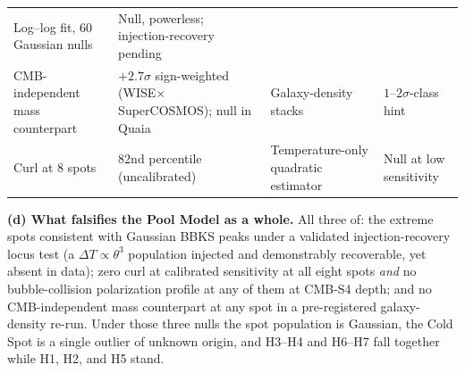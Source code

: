 \documentclass[
]{article}
\begin{document}
\begin{longtable}[]{@{}llll@{}}
\begin{minipage}[t]{0.22\columnwidth}
Log--log fit, 60 Gaussian nulls\strut
\end{minipage} & \begin{minipage}[t]{0.22\columnwidth}\raggedright
Null, powerless; injection-recovery pending\strut
\end{minipage}\tabularnewline
\begin{minipage}[t]{0.22\columnwidth}\raggedright
CMB-independent mass counterpart\strut
\end{minipage} & \begin{minipage}[t]{0.22\columnwidth}\raggedright
\(+2.7\sigma\) sign-weighted (WISE\(\times\)SuperCOSMOS); null in
Quaia\strut
\end{minipage} & \begin{minipage}[t]{0.22\columnwidth}\raggedright
Galaxy-density stacks\strut
\end{minipage} & \begin{minipage}[t]{0.22\columnwidth}\raggedright
\(1\)--\(2\sigma\)-class hint\strut
\end{minipage}\tabularnewline
\begin{minipage}[t]{0.22\columnwidth}\raggedright
Curl at 8 spots\strut
\end{minipage} & \begin{minipage}[t]{0.22\columnwidth}\raggedright
82nd percentile (uncalibrated)\strut
\end{minipage} & \begin{minipage}[t]{0.22\columnwidth}\raggedright
Temperature-only quadratic estimator\strut
\end{minipage} & \begin{minipage}[t]{0.22\columnwidth}\raggedright
Null at low sensitivity\strut
\end{minipage}\tabularnewline
\bottomrule
\end{longtable}

\textbf{(d) What falsifies the Pool Model as a whole.} All three of: the
extreme spots consistent with Gaussian BBKS peaks under a validated
injection-recovery locus test (a \(\Delta T \propto \theta^3\)
population injected and demonstrably recoverable, yet absent in data);
zero curl at calibrated sensitivity at all eight spots \emph{and} no
bubble-collision polarization profile at any of them at CMB-S4 depth;
and no CMB-independent mass counterpart at any spot in a pre-registered
galaxy-density re-run. Under those three nulls the spot population is
Gaussian, the Cold Spot is a single outlier of unknown origin, and
H3--H4 and H6--H7 fall together while H1, H2, and H5 stand.
\end{document}
